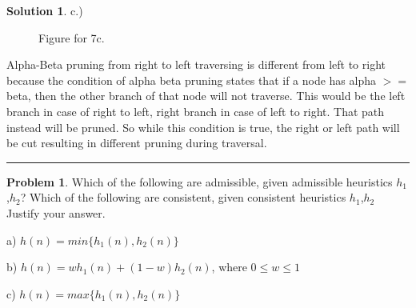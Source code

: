 \documentclass{article}
\theoremstyle{definition}
\newtheorem{problem}{Problem}
\def\fline{\rule{0.75\linewidth}{0.5pt}}
\newcommand{\finishline}{\begin{center}\fline\end{center}}
\newtheorem*{solution*}{Solution}
\newenvironment{solution}{\begin{solution*}}{{\finishline} \end{solution*}}
\begin{document}
\begin{solution}
	\item  c.)
	\item \begin{figure}[h!]
			\centering
			\item 
		 	\caption{Figure for 7c.}
		\end{figure}
	\item Alpha-Beta pruning from right to left traversing is different from left to right because the condition of alpha beta pruning states that if a node has alpha $>=$ beta, then the other branch of that node will not traverse. This would be the left branch in case of right to left, right branch in case of left to right. That path instead will be pruned. So while this condition is true, the right or left path will be cut resulting in different pruning during traversal. 

\end{solution}

\begin{problem} %
    Which of the following are admissible, given admissible heuristics $h_1$,$h_2$? Which of the following are consistent, given consistent heuristics $h_1$,$h_2$ Justify your answer. 
    \item a) $h(n) = min\{h_1(n),h_2(n)\}$
    \item b) $h(n) = wh_1(n)+(1-w)h_2(n)$, where $0 \le w \le 1$
    \item c) $h(n) = max\{h_1(n),h_2(n)\}$

\end{problem}
\end{document}

